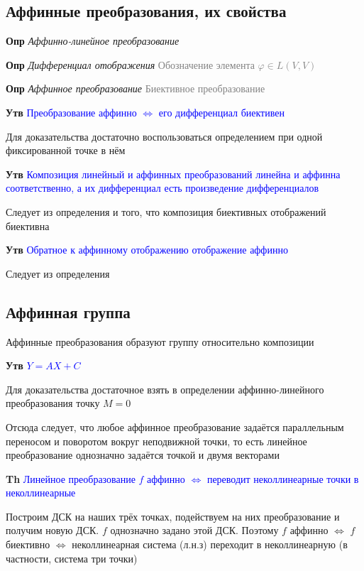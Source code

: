 \documentclass[a4paper, 14pt]{article}
\begin{document}
    \subsection{Аффинные преобразования, их свойства}

    \textbf{Опр} \textit{Аффинно-линейное преобразование}

    \textbf{Опр} \textit{Дифференциал отображения} \textcolor{gray}{Обозначение элемента $\varphi \in L(V, V)$}

    \textbf{Опр} \textit{Аффинное преобразование} \textcolor{gray}{Биективное преобразование}

    \textbf{Утв} \textcolor{blue}{Преобразование аффинно $\Leftrightarrow$ его дифференциал биективен}

    Для доказательства достаточно воспользоваться определением при одной фиксированной точке в нём

    \textbf{Утв} \textcolor{blue}{Композиция линейный и аффинных преобразований линейна и аффинна соответственно, а
    их дифференциал есть произведение дифференциалов}

    Следует из определения и того, что композиция биективных отображений биективна

    \textbf{Утв} \textcolor{blue}{Обратное к аффинному отображению отображение аффинно}

    Следует из определения

    \subsection{Аффинная группа}

    Аффинные преобразования образуют группу относительно композиции

    \textbf{Утв} \textcolor{blue}{$Y = AX + C$}

    Для доказательства достаточное взять в определении аффинно-линейного преобразования точку $M = 0$

    Отсюда следует, что любое аффинное преобразование задаётся параллельным переносом и поворотом вокруг неподвижной
    точки, то есть линейное преобразование однозначно задаётся точкой и двумя векторами

    \textbf{Th} \textcolor{blue}{Линейное преобразование $f$ аффинно $\Leftrightarrow$ переводит неколлинеарные
    точки в неколлинеарные}

    Построим ДСК на наших трёх точках, подействуем на них преобразование и получим новую ДСК. $f$ однозначно задано
    этой ДСК.
    Поэтому $f$ аффинно $\Leftrightarrow$ $f$ биективно $\Leftrightarrow$ неколлинеарная система (л.н.з)
    переходит в неколлинеарную (в частности, система три точки)
\end{document}
